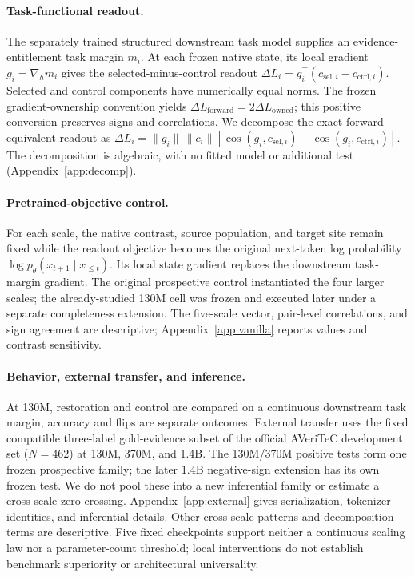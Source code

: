 \documentclass{article}
\begin{document}
\paragraph{Task-functional readout.}
The separately trained structured downstream task model supplies an evidence-entitlement task margin $m_i$. At each frozen native state, its local gradient $g_i=\nabla_h m_i$ gives the selected-minus-control readout $\Delta L_i=g_i^\top(c_{\mathrm{sel},i}-c_{\mathrm{ctrl},i})$. Selected and control components have numerically equal norms. The frozen gradient-ownership convention yields $\Delta L_{\mathrm{forward}}=2\Delta L_{\mathrm{owned}}$; this positive conversion preserves signs and correlations. We decompose the exact forward-equivalent readout as $\Delta L_i=\|g_i\|\,\|c_i\|[\cos(g_i,c_{\mathrm{sel},i})-\cos(g_i,c_{\mathrm{ctrl},i})]$. The decomposition is algebraic, with no fitted model or additional test (Appendix~\ref{app:decomp}).

\paragraph{Pretrained-objective control.}
For each scale, the native contrast, source population, and target site remain fixed while the readout objective becomes the original next-token log probability $\log p_\theta(x_{t+1}\mid x_{\leq t})$. Its local state gradient replaces the downstream task-margin gradient. The original prospective control instantiated the four larger scales; the already-studied 130M cell was frozen and executed later under a separate completeness extension. The five-scale vector, pair-level correlations, and sign agreement are descriptive; Appendix~\ref{app:vanilla} reports values and contrast sensitivity.

\paragraph{Behavior, external transfer, and inference.}
At 130M, restoration and control are compared on a continuous downstream task margin; accuracy and flips are separate outcomes. External transfer uses the fixed compatible three-label gold-evidence subset of the official AVeriTeC development set ($N=462$) at 130M, 370M, and 1.4B. The 130M/370M positive tests form one frozen prospective family; the later 1.4B negative-sign extension has its own frozen test. We do not pool these into a new inferential family or estimate a cross-scale zero crossing. Appendix~\ref{app:external} gives serialization, tokenizer identities, and inferential details. Other cross-scale patterns and decomposition terms are descriptive. Five fixed checkpoints support neither a continuous scaling law nor a parameter-count threshold; local interventions do not establish benchmark superiority or architectural universality.
\end{document}
